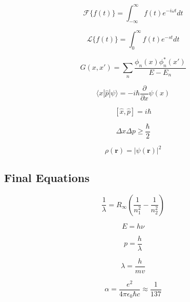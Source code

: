 \documentclass{article}
\begin{document}
\begin{equation}\label{eq:034}
\mathcal{F}\{f(t)\} = \int_{-\infty}^\infty f(t)e^{-i\omega t} dt
\end{equation}

\begin{equation}\label{eq:035}
\mathcal{L}\{f(t)\} = \int_0^\infty f(t)e^{-st} dt
\end{equation}

\begin{equation}\label{eq:036}
G(x,x') = \sum_n \frac{\phi_n(x)\phi_n^*(x')}{E - E_n}
\end{equation}

\begin{equation}\label{eq:037}
\langle x | \hat{p} | \psi \rangle = -i\hbar\frac{\partial}{\partial x}\psi(x)
\end{equation}

\begin{equation}\label{eq:038}
[\hat{x}, \hat{p}] = i\hbar
\end{equation}

\begin{equation}\label{eq:039}
\Delta x \Delta p \geq \frac{\hbar}{2}
\end{equation}

\begin{equation}\label{eq:040}
\rho(\mathbf{r}) = |\psi(\mathbf{r})|^2
\end{equation}

\subsection{Final Equations}\label{subsec:final}

\begin{equation}\label{eq:041}
\frac{1}{\lambda} = R_\infty\left(\frac{1}{n_1^2} - \frac{1}{n_2^2}\right)
\end{equation}

\begin{equation}\label{eq:042}
E = h\nu
\end{equation}

\begin{equation}\label{eq:043}
p = \frac{h}{\lambda}
\end{equation}

\begin{equation}\label{eq:044}
\lambda = \frac{h}{mv}
\end{equation}

\begin{equation}\label{eq:045}
\alpha = \frac{e^2}{4\pi\epsilon_0\hbar c} \approx \frac{1}{137}
\end{equation}
\end{document}
